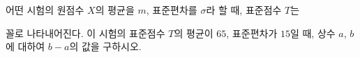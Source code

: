 어떤 시험의 원점수 $X$의 평균을 $m$, 표준편차를 $\sigma$라 할 때, 표준점수 $T$는 \par\smallskip{}\par\smallskip\noindent 꼴로 나타내어진다. 이 시험의 표준점수 $T$의 평균이 $65$, 표준편차가 $15$일 때, 상수 $a$, $b$에 대하여 $b-a$의 값을 구하시오.
